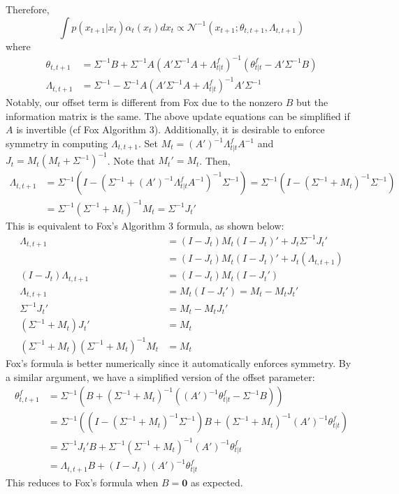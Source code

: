 \documentclass[12pt]{article}
\begin{document}
Therefore,
\[\int p(x_{t+1}|x_t)\alpha_t(x_t)dx_t \propto \mathcal{N}^{-1}(x_{t+1};\theta_{t,t+1},\Lambda_{t,t+1})\]
where
\begin{align*}
\theta_{t,t+1} &=\Sigma^{-1}B + \Sigma^{-1}A(A'\Sigma^{-1}A+\Lambda^f_{t|t})^{-1}(\theta^f_{t|t} - A'\Sigma^{-1}B)\\
\Lambda_{t,t+1} &= \Sigma^{-1} - \Sigma^{-1}A(A'\Sigma^{-1}A+\Lambda^f_{t|t})^{-1}A'\Sigma^{-1}
\end{align*}
Notably, our offset term is different from Fox due to the nonzero $B$ but the information matrix is the same. The above update equations can be simplified if $A$ is invertible (cf Fox Algorithm 3). Additionally, it is desirable to enforce symmetry in computing $\Lambda_{t,t+1}$. Set $M_t = (A')^{-1}\Lambda^f_{t|t}A^{-1}$ and $J_t = M_t(M_t+\Sigma^{-1})^{-1}$. Note that $M_t' = M_t$. Then,
\begin{align*}
\Lambda_{t,t+1} &= \Sigma^{-1}\left(I - \left(\Sigma^{-1}+(A')^{-1}\Lambda^f_{t|t}A^{-1}\right)^{-1}\Sigma^{-1}\right) = \Sigma^{-1}\left(I - \left(\Sigma^{-1}+M_t\right)^{-1}\Sigma^{-1}\right)\\
&=\Sigma^{-1}\left(\Sigma^{-1}+M_t\right)^{-1}M_t = \Sigma^{-1}J_t'
\end{align*}
This is equivalent to Fox's Algorithm 3 formula, as shown below:
\begin{align*}
\Lambda_{t,t+1} &= (I-J_t)M_t(I-J_t)' + J_t\Sigma^{-1}J_t'\\
 &= (I-J_t)M_t(I-J_t)' + J_t(\Lambda_{t,t+1})\\
 (I-J_t)\Lambda_{t,t+1} &= (I-J_t)M_t(I-J_t')\\
 \Lambda_{t,t+1} &= M_t(I-J_t') = M_t-M_tJ_t'\\
 \Sigma^{-1}J_t' &= M_t-M_tJ_t'\\
 (\Sigma^{-1} + M_t)J_t' &= M_t\\
 (\Sigma^{-1}+M_t)(\Sigma^{-1}+M_t)^{-1}M_t &= M_t
\end{align*}
Fox's formula is better numerically since it automatically enforces symmetry. By a similar argument, we have a simplified version of the offset parameter:
\begin{align*}
\theta^f_{t,t+1} &= \Sigma^{-1}\left(B+\left(\Sigma^{-1}+M_t\right)^{-1}\left((A')^{-1}\theta^f_{t|t} - \Sigma^{-1}B\right)\right)\\
&= \Sigma^{-1}\left(\left(I-(\Sigma^{-1}+M_t)^{-1}\Sigma^{-1}\right)B + \left(\Sigma^{-1}+M_t\right)^{-1}(A')^{-1}\theta^f_{t|t}\right)\\
&= \Sigma^{-1}J_t'B + \Sigma^{-1}(\Sigma^{-1}+M_t)^{-1}(A')^{-1}\theta^f_{t|t}\\
&= \Lambda_{t,t+1}B + (I-J_t)(A')^{-1}\theta^f_{t|t}
\end{align*}
This reduces to Fox's formula when $B=\mathbf{0}$ as expected.
\end{document}
